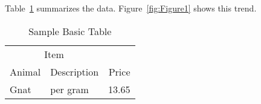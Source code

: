 Table~\ref{tab:BasicTable} summarizes the data.
Figure~\ref{fig:Figure1} shows this trend.

\begin{table}
  \caption{Sample Basic Table}
  \label{tab:BasicTable}
  \begin{tabular}{@{}llr@{}}         \toprule
  \multicolumn{2}{c}{Item}        \\ \cmidrule(r){1-2}
  Animal    & Description & Price \\ \midrule
  Gnat      & per gram    & 13.65 \\
  \end{tabular}
\end{table}

